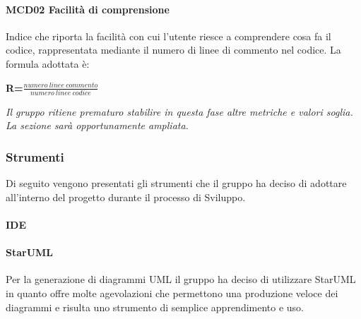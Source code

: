 \paragraph{MCD02 Facilità di comprensione}
Indice che riporta la facilità con cui l'utente riesce a comprendere cosa fa il codice, rappresentata mediante il numero di linee di commento nel codice.
La formula adottata è:\newline
\centerline{\textbf{R=$\frac{numero\ linee\ commento}{numero\ linee\ codice}$}}
\textit{Il gruppo ritiene prematuro stabilire in questa fase altre metriche e valori soglia. La sezione sarà opportunamente ampliata.}
\subsubsection{Strumenti}
Di seguito vengono presentati gli strumenti che il gruppo ha deciso di adottare all'interno del progetto durante il processo di Sviluppo.
\paragraph{IDE}
\paragraph{StarUML}
Per la generazione di diagrammi UML il gruppo ha deciso di utilizzare StarUML in quanto offre molte agevolazioni che permettono una produzione veloce dei diagrammi e risulta uno strumento di semplice apprendimento e uso.